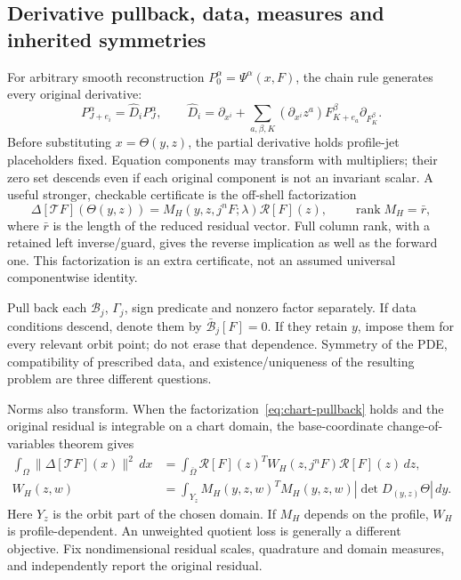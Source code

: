 \documentclass[11pt]{article}
\theoremstyle{definition}
\begin{document}
\subsection{Derivative pullback, data, measures and inherited symmetries}
\label{sec:pullback-core}
For arbitrary smooth reconstruction $P_0^\alpha=\Psi^\alpha(x,F)$,
the chain rule generates every original derivative:
\begin{equation}
 P_{J+e_i}^\alpha=\widehat D_iP_J^\alpha,\qquad
 \widehat D_i=\partial_{x^i}
 +\sum_{a,\beta,K}(\partial_{x^i}z^a)
             F_{K+e_a}^\beta\partial_{F_K^\beta}.
 \label{eq:pullback-recursion}
\end{equation}
Before substituting $x=\Theta(y,z)$, the partial derivative holds profile-jet
placeholders fixed. Equation components may transform with multipliers;
their zero set descends even if each original component is not an invariant
scalar. A useful stronger, checkable certificate is the off-shell factorization
\begin{equation}
 \Delta[\mathcal TF](\Theta(y,z))
       =M_H(y,z,j^nF;\lambda)\mathcal R[F](z),\qquad
 \operatorname{rank}M_H=\bar r,
 \label{eq:chart-pullback}
\end{equation}
where $\bar r$ is the length of the reduced residual vector. Full column rank,
with a retained left inverse/guard, gives the reverse implication as well as
the forward one. This factorization is an extra certificate, not an assumed
universal componentwise identity.

Pull back each $\mathcal B_j$, $\Gamma_j$, sign predicate and nonzero factor
separately. If data conditions descend, denote them by $\bar{\mathcal B}_j[F]=0$.
If they retain $y$, impose them for every relevant orbit point; do not erase
that dependence. Symmetry of the PDE, compatibility of prescribed data, and
existence/uniqueness of the resulting problem are three different questions.

Norms also transform. When the factorization~\eqref{eq:chart-pullback}
holds and the original residual is integrable on a chart domain, the
base-coordinate change-of-variables theorem gives
\begin{align}
 \int_\Omega\|\Delta[\mathcal TF](x)\|^2\,dx
 &=\int_{\bar\Omega}\mathcal R[F](z)^T W_H(z,j^nF)\mathcal R[F](z)\,dz,\\
 W_H(z,w)&=\int_{Y_z}M_H(y,z,w)^TM_H(y,z,w)
                   |\det D_{(y,z)}\Theta|\,dy.
 \label{eq:quotient-loss-measure}
\end{align}
Here $Y_z$ is the orbit part of the chosen domain. If $M_H$ depends on the
profile, $W_H$ is profile-dependent. An unweighted quotient loss is generally
a different objective. Fix nondimensional residual scales, quadrature and
domain measures, and independently report the original residual.
\end{document}
